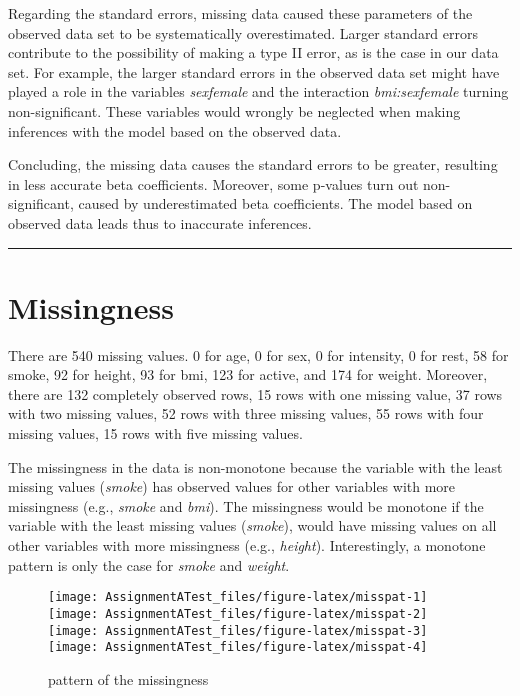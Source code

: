 \documentclass[
]{article}
\begin{document}
Regarding the standard errors, missing data caused these parameters of the observed data set to be systematically overestimated. Larger standard errors contribute to the possibility of making a type II error, as is the case in our data set. For example, the larger standard errors in the observed data set might have played a role in the variables \emph{sexfemale} and the interaction \emph{bmi:sexfemale} turning non-significant. These variables would wrongly be neglected when making inferences with the model based on the observed data.

Concluding, the missing data causes the standard errors to be greater, resulting in less accurate beta coefficients. Moreover, some p-values turn out non-significant, caused by underestimated beta coefficients. The model based on observed data leads thus to inaccurate inferences.

\begin{center}\rule{0.5\linewidth}{0.5pt}\end{center}

\hypertarget{miss}{%
\section{Missingness}\label{miss}}

There are 540 missing values. 0 for age, 0 for sex, 0 for intensity, 0 for rest, 58 for smoke, 92 for height, 93 for bmi, 123 for active, and 174 for weight. Moreover, there are 132 completely observed rows, 15 rows with one missing value, 37 rows with two missing values, 52 rows with three missing values, 55 rows with four missing values, 15 rows with five missing values.

The missingness in the data is non-monotone because the variable with the least missing values (\emph{smoke}) has observed values for other variables with more missingness (e.g., \emph{smoke} and \emph{bmi}). The missingness would be monotone if the variable with the least missing values (\emph{smoke}), would have missing values on all other variables with more missingness (e.g., \emph{height}). Interestingly, a monotone pattern is only the case for \emph{smoke} and \emph{weight}.

\begin{figure}
\texttt{[image: AssignmentATest\_files/figure-latex/misspat-1]} \texttt{[image: AssignmentATest\_files/figure-latex/misspat-2]} \texttt{[image: AssignmentATest\_files/figure-latex/misspat-3]} \texttt{[image: AssignmentATest\_files/figure-latex/misspat-4]} \caption{pattern of the missingness}\label{fig:misspat}
\end{figure}
\end{document}
